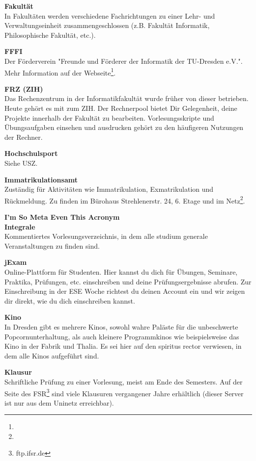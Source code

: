 \textbf{Fakultät} \\
In Fakultäten werden verschiedene Fachrichtungen zu einer Lehr- und Verwaltungseinheit zusammengeschlossen (z.B. Fakultät Informatik, Philosophische Fakultät, etc.).

\textbf{FFFI} \\
Der Förderverein "Freunde und Förderer der Informatik der TU-Dresden e.V.".
Mehr Information auf der Webseite\footnote{}.

\textbf{FRZ (ZIH)} \\
Das Rechenzentrum in der Informatikfakultät wurde früher von dieser betrieben.
Heute gehört es mit zum ZIH.
Der Rechnerpool bietet Dir Gelegenheit, deine Projekte innerhalb der Fakultät zu bearbeiten.
Vorlesungsskripte und Übungsaufgaben einsehen und ausdrucken gehört zu den häufigeren Nutzungen der Rechner.

\textbf{Hochschulsport} \\
Siehe USZ.

\textbf{Immatrikulationsamt} \\
Zuständig für Aktivitäten wie Immatrikulation, Exmatrikulation und Rückmeldung.
Zu finden im Bürohaus Strehlenerstr. 24, 6. Etage und im Netz\footnote{}.

\textbf{I'm So Meta Even This Acronym} \\

\textbf{Integrale} \\
Kommentiertes Vorlesungsverzeichnis, in dem alle studium generale Veranstaltungen zu finden sind.

\textbf{jExam} \\
Online-Plattform für Studenten.
Hier kannst du dich für Übungen, Seminare, Praktika, Prüfungen, etc. einschreiben und deine Prüfungsergebnisse abrufen.
Zur Einschreibung in der ESE Woche richtest du deinen Account ein und wir zeigen dir direkt, wie du dich einschreiben kannst.

\textbf{Kino} \\
In Dresden gibt es mehrere Kinos, sowohl wahre Paläste für die unbeschwerte Popcornunterhaltung, als auch kleinere Programmkinos wie beispielsweise das Kino in der Fabrik und Thalia.
Es sei hier auf den spiritus rector verwiesen, in dem alle Kinos aufgeführt sind.

\textbf{Klausur} \\
Schriftliche Prüfung zu einer Vorlesung, meist am Ende des Semesters.
Auf der Seite des FSR\footnote{ftp.ifsr.de} sind viele Klausuren vergangener Jahre erhältlich (dieser Server ist nur aus dem Uninetz erreichbar).

